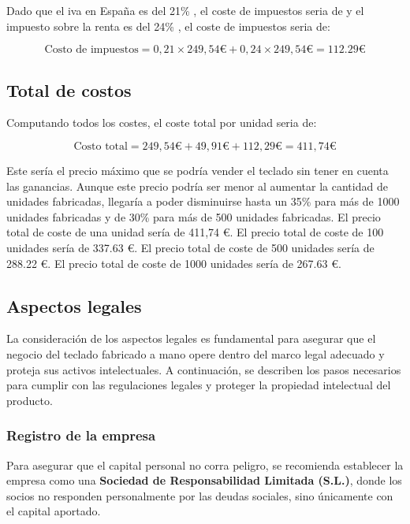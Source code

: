 Dado que el iva en España es del 21\% \cite{IVA}, el coste de impuestos seria de y el impuesto sobre la renta es del 24\% \cite{ImpuestoRenta}, el coste de impuestos seria de:

\begin{equation}
    \text{Costo de impuestos} = 0,21 \times 249,54 \euro + 0,24 \times 249,54 \euro = 112.29 \euro
\end{equation}

\subsection{Total de costos}
Computando todos los costes, el coste total por unidad seria de:

\begin{equation}
    \text{Costo total} = 249,54 \euro + 49,91 \euro + 112,29 \euro = 411,74 \euro
\end{equation}

Este sería el precio máximo que se podría vender el teclado sin tener en cuenta las ganancias. Aunque este precio podría ser menor al aumentar la cantidad de unidades fabricadas, llegaría a poder disminuirse hasta un 35\% para más de 1000 unidades fabricadas y de 30\% para más de 500 unidades fabricadas.
El precio total de coste de una unidad sería de 411,74 \euro.
El precio total de coste de 100 unidades sería de 337.63 \euro.
El precio total de coste de 500 unidades sería de 288.22 \euro.
El precio total de coste de 1000 unidades sería de 267.63 \euro.

\subsection{Aspectos legales}

La consideración de los aspectos legales es fundamental para asegurar que el negocio del teclado fabricado a mano opere dentro del marco legal adecuado y proteja sus activos intelectuales. A continuación, se describen los pasos necesarios para cumplir con las regulaciones legales y proteger la propiedad intelectual del producto.

\subsubsection{Registro de la empresa}

Para asegurar que el capital personal no corra peligro, se recomienda establecer la empresa como una \textbf{Sociedad de Responsabilidad Limitada (S.L.)}, donde los socios no responden personalmente por las deudas sociales, sino únicamente con el capital aportado.

